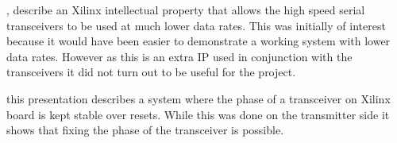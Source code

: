 \noindent \cite{dru_guide}, \cite{nidru} describe an Xilinx intellectual
property that allows the high speed serial transceivers to be used at much
lower data rates. This was initially of interest because it would have been
easier to demonstrate a working system with lower data rates. However as this
is an extra IP used in conjunction with the transceivers it did not turn out to
be useful for the project. 

\noindent \cite{mendes_transceiver} this presentation describes a system where
the phase of a transceiver on Xilinx board is kept stable over resets. While
this was done on the transmitter side it shows that fixing the phase of the
transceiver is possible.

